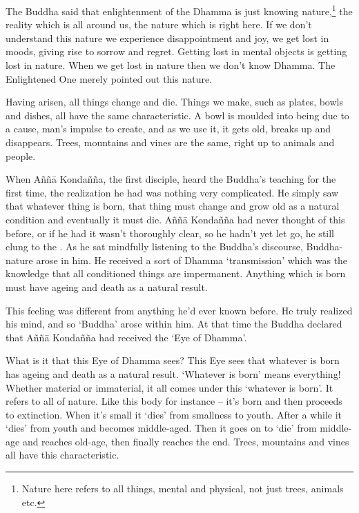 The Buddha said that enlightenment of the Dhamma is just knowing nature,\footnote{Nature here refers to all things, mental and physical, not just trees, animals etc.} the reality which is all around us, the nature which is right here. If we don't understand this nature we experience disappointment and joy, we get lost in moods, giving rise to sorrow and regret. Getting lost in mental objects is getting lost in nature. When we get lost in nature then we don't know Dhamma. The Enlightened One merely pointed out this nature. 

Having arisen, all things change and die. Things we make, such as plates, bowls and dishes, all have the same characteristic. A bowl is moulded into being due to a cause, man's impulse to create, and as we use it, it gets old, breaks up and disappears. Trees, mountains and vines are the same, right up to animals and people. 

When A\~n\~n\=a Konda\~n\~na, the first disciple, heard the Buddha's teaching for the first time, the realization he had was nothing very complicated. He simply saw that whatever thing is born, that thing must change and grow old as a natural condition and eventually it must die. A\~n\~n\=a Konda\~n\~na had never thought of this before, or if he had it wasn't thoroughly clear, so he hadn't yet let go, he still clung to the . As he sat mindfully listening to the Buddha's discourse, Buddha-nature arose in him. He received a sort of Dhamma `transmission' which was the knowledge that all conditioned things are impermanent. Anything which is born must have ageing and death as a natural result. 

This feeling was different from anything he'd ever known before. He truly realized his mind, and so `Buddha' arose within him. At that time the Buddha declared that A\~n\~n\=a Konda\~n\~na had received the `Eye of Dhamma'. 

What is it that this Eye of Dhamma sees? This Eye sees that whatever is born has ageing and death as a natural result. `Whatever is born' means everything! Whether material or immaterial, it all comes under this `whatever is born'. It refers to all of nature. Like this body for instance -- it's born and then proceeds to extinction. When it's small it `dies' from smallness to youth. After a while it `dies' from youth and becomes middle-aged. Then it goes on to `die' from middle-age and reaches old-age, then finally reaches the end. Trees, mountains and vines all have this characteristic. 


